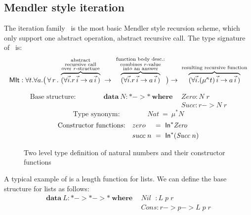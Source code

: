 \subsection{Mendler style iteration}\label{sec:mendler:it}
The iteration family \MIt\ is the most basic Mendler style recursion scheme,
which only support one abstract operation, abstract recursive call.
The type signature of \MIt\ is:
\[ \textsf{MIt} : \forall t . \forall a .
   \big(\, \forall\, r\, . \;
         \overset{\begin{smallmatrix}
                        \text{abstract} \\
                        \text{recursive call} \\
                        \text{over $r$-structure}
                       \end{smallmatrix}}{\overbrace{
            (\forall\vec{i} . r\,\vec{i} -> a\,\vec{i}\,) }} \;
   -> \; \overset{\begin{smallmatrix}
                        \text{function body desc.:} \\
                        \text{combines $r$-value} \\
                        \text{into an answer}
                       \end{smallmatrix}}{\overbrace{
            (\forall\vec{i} . r\,\vec{i} -> a\,\vec{i}\,) }}
   \big)
 -> \; \overset{\text{resulting recursive function}}{\overbrace{
          (\forall\vec{i} . (\mu^\kappa t)\,\vec{i} -> a\,\vec{i}\,) }} 
\]
\begin{figure}
\begin{align*}
\text{Base structure:}\qquad\qquad
\textbf{data}~N : * -> * ~\textbf{where}~~
& \textit{Zero} : N\;r\\
& \textit{Succ} : r -> N\;r
\end{align*}
\[\text{Type synonym:}\qquad\qquad \textit{Nat} ~=~ \mu^{*} N\]
\begin{align*}
\text{Constructor functions:}\quad
&zero~~\,~=~ \textsf{In}^{*} \textit{Zero} \\
&succ\;n ~=~ \textsf{In}^{*} (\textit{Succ}\;n)
\end{align*}
\caption{Two level type definition of natural numbers and
         their constructor functions}
\label{fig:natdef}
\end{figure}
A typical example of is a length function for lists.
We can define the base structure for lists as follows:
\begin{align*}
\textbf{data}~L : * -> * -> * ~\textbf{where}~~
& \textit{Nil}~~\, : L\;p\;r \\
& \textit{Cons}    : r -> p -> L\;p\;r
\end{align*}
